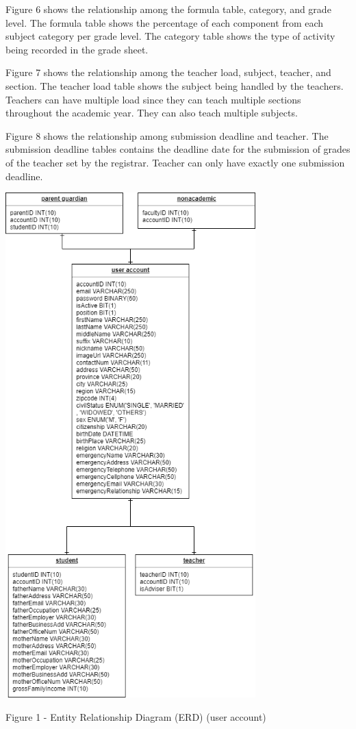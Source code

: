 \documentclass[11pt,a4paper,titlepage]{article}
\begin{document}
Figure 6 shows the relationship among the formula table, category, and grade level. The formula table shows the percentage of each component from each subject category per grade level. The category table shows the type of activity being recorded in the grade sheet. 

Figure 7 shows the relationship among the teacher load, subject, teacher, and section. The teacher load table shows the subject being handled by the teachers. Teachers can have multiple load since they can teach multiple sections throughout the academic year. They can also teach multiple subjects.

Figure 8 shows the relationship among submission deadline and teacher. The submission deadline tables contains the deadline date for the submission of grades of the teacher set by the registrar. Teacher can only have exactly one submission deadline.

\vspace{1cm}
\newpage
\begin{center}
    \includegraphics[height=19.5cm]{User.png}
\end{center}
\vspace{1cm}
\begin{center}
    Figure 1 - Entity Relationship Diagram (ERD) (user account)
\end{center}
\end{document}
